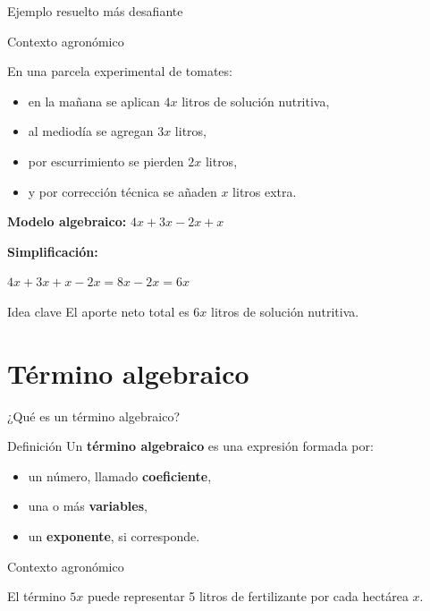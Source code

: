 \documentclass[aspectratio=169,12pt]{beamer}
\newcommand{\IdeaClave}[1]{
	\begin{alertblock}{Idea clave}
		#1
	\end{alertblock}
}
\newcommand{\Agronomia}[1]{
	\begin{exampleblock}{Contexto agronómico}
		#1
	\end{exampleblock}
}
\begin{document}
	\begin{frame}{Ejemplo resuelto más desafiante}
		\Agronomia{
			En una parcela experimental de tomates:
			\begin{itemize}
				\item en la mañana se aplican \(4x\) litros de solución nutritiva,
				\pause
				\item al mediodía se agregan \(3x\) litros,
				\pause
				\item por escurrimiento se pierden \(2x\) litros,
				\pause
				\item y por corrección técnica se añaden \(x\) litros extra.
			\end{itemize}
		}
		
		\pause
		\textbf{Modelo algebraico: } $4x+3x-2x+x$
		
		\medskip
		
		\pause
		
		\textbf{Simplificación:}
	
	\medskip 
	
	\qquad $4x+3x+x-2x=8x-2x=6x$
		
		\pause
		\IdeaClave{El aporte neto total es \(6x\) litros de solución nutritiva.}
	\end{frame}
	
	\section{Término algebraico}
	\begin{frame}{¿Qué es un término algebraico?}
		\begin{block}{Definición}
			Un \textbf{término algebraico} es una expresión formada por:
			\begin{itemize}
				\item un número, llamado \textbf{coeficiente},
				\pause
				\item una o más \textbf{variables},
				\pause
				\item un \textbf{exponente}, si corresponde.
			\end{itemize}
		\end{block}
		
		\pause
		\Agronomia{
			El término \(5x\) puede representar 5 litros de fertilizante por cada hectárea \(x\).
		}
	\end{frame}
	
\end{document}
